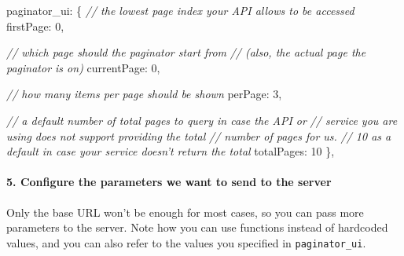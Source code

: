 \documentclass[9pt]{book}
\newenvironment{Shaded}{}{}
\newcommand{\DataTypeTok}[1]{\textcolor[rgb]{0.56,0.13,0.00}{{#1}}}
\newcommand{\DecValTok}[1]{\textcolor[rgb]{0.25,0.63,0.44}{{#1}}}
\newcommand{\CommentTok}[1]{\textcolor[rgb]{0.38,0.63,0.69}{\textit{{#1}}}}
\newcommand{\NormalTok}[1]{{#1}}
\begin{document}
\begin{Shaded}
\begin{Highlighting}[]
    \NormalTok{paginator_ui: \{}
      \CommentTok{// the lowest page index your API allows to be accessed}
      \DataTypeTok{firstPage}\NormalTok{: }\DecValTok{0}\NormalTok{,}

      \CommentTok{// which page should the paginator start from}
      \CommentTok{// (also, the actual page the paginator is on)}
      \DataTypeTok{currentPage}\NormalTok{: }\DecValTok{0}\NormalTok{,}

      \CommentTok{// how many items per page should be shown}
      \DataTypeTok{perPage}\NormalTok{: }\DecValTok{3}\NormalTok{,}

      \CommentTok{// a default number of total pages to query in case the API or}
      \CommentTok{// service you are using does not support providing the total}
      \CommentTok{// number of pages for us.}
      \CommentTok{// 10 as a default in case your service doesn't return the total}
      \DataTypeTok{totalPages}\NormalTok{: }\DecValTok{10}
    \NormalTok{\},}
\end{Highlighting}
\end{Shaded}

\paragraph{5. Configure the parameters we want to send to the
server}\label{configure-the-parameters-we-want-to-send-to-the-server}

Only the base URL won't be enough for most cases, so you can pass more
parameters to the server. Note how you can use functions instead of
hardcoded values, and you can also refer to the values you specified in
\texttt{paginator\_ui}.
\end{document}

